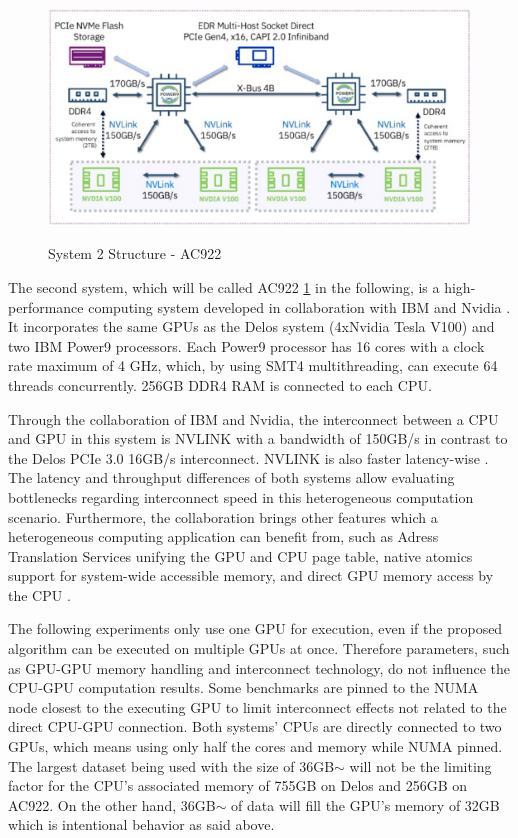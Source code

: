 \begin{figure}[H]
  \caption{System 2 Structure - AC922 \cite{ganesannarayanasamyPowerAIDeepDive12:39:24UTC}}
  \includegraphics[width=\textwidth]{figures/ac922_system_arch.png}
  \centering
  \label{fig:ac922_arch}
\end{figure}

The second system, which will be called AC922 \ref{fig:ac922_arch} in the following, is a high-performance computing system developed in collaboration with IBM and Nvidia \cite{caldeiraIBMPowerSystem}. It incorporates the same GPUs as the Delos system (4xNvidia Tesla V100) and two IBM Power9 processors. Each Power9 processor has 16 cores with a clock rate maximum of 4 GHz, which, by using SMT4 multithreading, can execute 64 threads concurrently. 256GB DDR4 RAM is connected to each CPU.

Through the collaboration of IBM and Nvidia, the interconnect between a CPU and GPU in this system is NVLINK \cite{NVLink2021, zargesEvaluationOnNodeGPU} with a bandwidth of 150GB/s in contrast to the Delos PCIe 3.0 16GB/s interconnect. NVLINK is also faster latency-wise \cite{liEvaluatingModernGPU2020}. The latency and throughput differences of both systems allow evaluating bottlenecks regarding interconnect speed in this heterogeneous computation scenario.
Furthermore, the collaboration brings other features which a heterogeneous computing application can benefit from, such as Adress Translation Services \cite{ibmpower9nputeamFunctionalityPerformanceNVLink2018} unifying the GPU and CPU page table, native atomics support for system-wide accessible memory, and direct GPU memory access by the CPU \cite{UNIFIEDMEMORYP9}.

The following experiments only use one GPU for execution, even if the proposed algorithm can be executed on multiple GPUs at once. Therefore parameters, such as GPU-GPU memory handling and interconnect technology, do not influence the CPU-GPU computation results. Some benchmarks are pinned to the NUMA node closest to the executing GPU to limit interconnect effects not related to the direct CPU-GPU connection. Both systems' CPUs are directly connected to two GPUs, which means using only half the cores and memory while NUMA pinned. The largest dataset being used with the size of 36GB$\sim$ will not be the limiting factor for the CPU's associated memory of 755GB on Delos and 256GB on AC922. On the other hand, 36GB$\sim$ of data will fill the GPU's memory of 32GB which is intentional behavior as said above.

